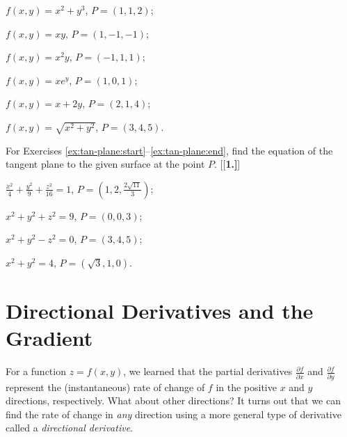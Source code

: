 \begin{enumerate}[\bfseries 1.]
 \begin{multicols}{2}
  \item\label{ex:tan-plane-graph:start} $f(x,y) = x^2 + y^3$, $P=(1,1,2)$;
  \item $f(x,y) = xy$, $P=(1,-1,-1)$;
 \end{multicols}
 \begin{multicols}{2}
  \item $f(x,y) = x^2 y$, $P=(-1,1,1)$;
  \item $f(x,y) = xe^y$, $P=(1,0,1)$;
 \end{multicols}
 \begin{multicols}{2}
  \item $f(x,y) = x+2y$, $P=(2,1,4)$;
  \item\label{ex:tan-plane-graph:end} $f(x,y) = \sqrt{x^2 + y^2}$, $P=(3,4,5)$.
 \end{multicols}
\par\noindent For Exercises \ref{ex:tan-plane:start}--\ref{ex:tan-plane:end}, find the equation of the tangent plane to the given surface at the point $P$.
[{[\bfseries 1.]}]
 \begin{multicols}{2}
  \item\label{ex:tan-plane:start} $\frac{x^2}{4} + \frac{y^2}{9}  + \frac{z^2}{16} = 1$, $P=\left(1,2,\frac{2\sqrt{11}}{3}\right)$;
  \item $x^2 + y^2 +z^2 = 9$, $P=(0,0,3)$;
 \end{multicols}
 \begin{multicols}{2}
  \item $x^2 + y^2 - z^2 = 0$, $P=(3,4,5)$;
  \item\label{ex:tan-plane:end} $x^2 + y^2 = 4$, $P=(\sqrt{3},1,0)$.
 \end{multicols}
\end{enumerate}
\newpage
\section{Directional Derivatives and the Gradient}
For a function $z=f(x,y)$, we learned that the partial derivatives $\tfrac{\partial f}{\partial x}$ and
$\tfrac{\partial f}{\partial y}$ represent the (instantaneous) rate of change of $f$ in the positive $x$ and $y$
directions, respectively. What about other directions? It turns out that we can find the rate of change in
\emph{any} direction using a more general type of derivative called a \emph{directional derivative}.

